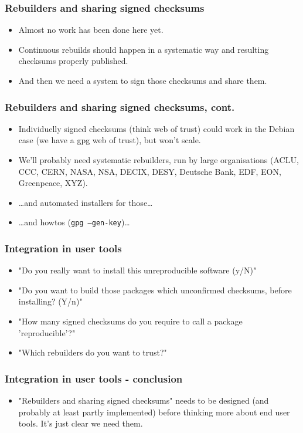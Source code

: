 \documentclass[14pt,aspectratio=169]{beamer}
\begin{document}
\begin{frame}
 \frametitle{Rebuilders and sharing signed checksums}
 \begin{itemize}
  \item Almost no work has been done here yet.
  \item<2-3> Continuous rebuilds should happen in a systematic way and resulting
  checksums properly published.
  \item<3> And then we need a system to sign those checksums and share them. 
 \end{itemize}
\end{frame}

\begin{frame}
 \frametitle{Rebuilders and sharing signed checksums, cont.}
 \begin{itemize}
  \item Individuelly signed checksums (think web of trust) could work in the
  Debian case (we have a gpg web of trust), but won't scale.
  \item<2-4> { We'll probably need systematic rebuilders, run by large organisations
  (ACLU, CCC, CERN, NASA, NSA, DECIX, DESY, Deutsche Bank, EDF, EON, Greenpeace, XYZ).}
  \item<3-4> { …and automated installers for those… }
  \item<4> { …and howtos (\texttt {gpg --gen-key})…}
 \end{itemize}
\end{frame}


\begin{frame}
 \frametitle{Integration in user tools}
 \begin{itemize}
  \item "Do you really want to install this unreproducible software (y/N)"
  \item<2-4> "Do you want to build those packages which unconfirmed checksums,
  before installing? (Y/n)"
  \item<3-4>{ "How many signed checksums do you require to call a package
  'reproducible'?"}
  \item<4>{ "Which rebuilders do you want to trust?"}
 \end{itemize}
\end{frame}

\begin{frame}
 \frametitle{Integration in user tools - conclusion}
 \begin{itemize}
  \item "Rebuilders and sharing signed checksums" needs to be designed
  (and probably at least partly implemented) before thinking more about end
  user tools. It's just clear we need them. 
 \end{itemize}
\end{frame}
\end{document}

